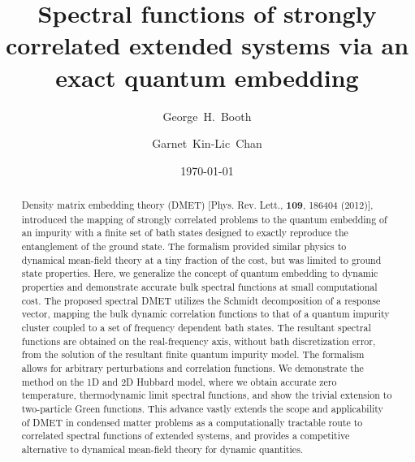 \documentclass[aps,twocolumn,nobibnotes]{revtex4}
\begin{document}
\title{Spectral functions of strongly correlated extended systems via an exact quantum embedding}
\author{George~H.~Booth}
\author{Garnet~Kin-Lic~Chan}  

\begin{abstract}
Density matrix embedding theory (DMET) [Phys. Rev. Lett., {\bf 109}, 186404 (2012)], introduced the mapping of strongly correlated problems 
to the quantum embedding
of an impurity with a finite set of bath states designed to exactly reproduce the entanglement of the ground state. The formalism
provided similar physics to dynamical mean-field theory at a tiny fraction of the cost, but was limited to ground state properties.
Here, we generalize the concept of quantum embedding to dynamic properties and demonstrate accurate bulk spectral functions at small
computational cost. 
The proposed spectral DMET utilizes the Schmidt decomposition of a response vector, mapping the bulk dynamic correlation functions to that of
a quantum impurity cluster coupled to a set of frequency dependent bath states.
The resultant spectral functions are obtained on the real-frequency axis, without bath discretization error, from the solution of the resultant
finite quantum impurity model. The formalism allows for arbitrary perturbations and correlation functions.
We demonstrate the method on the 1D and 2D Hubbard model, where we obtain accurate 
zero temperature, thermodynamic limit spectral functions, and show the trivial extension to two-particle Green functions. 
This advance vastly extends the scope and applicability 
of DMET in condensed matter problems as a computationally tractable route to correlated spectral functions of extended systems, 
and provides a competitive alternative to dynamical mean-field theory for dynamic quantities.
\end{abstract}
\date{\today}
\maketitle
\end{document}
